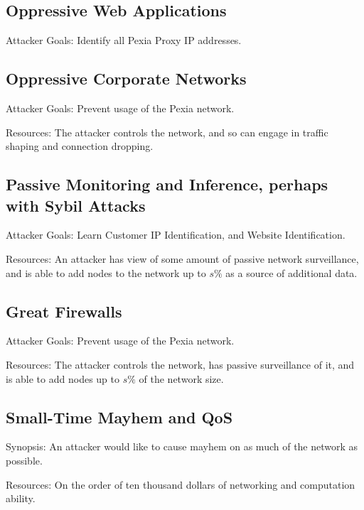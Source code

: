 \documentclass{article}
\newcommand{\mesh}{Pexia}
\newcommand{\Pexia}{\mesh}
\begin{document}
\subsection{Oppressive Web Applications}

Attacker Goals: Identify all \Pexia{} Proxy IP addresses.

\subsection{Oppressive Corporate Networks}

Attacker Goals: Prevent usage of the \Pexia{} network.

Resources: The attacker controls the network, and so can engage in traffic shaping and connection dropping.

\subsection{Passive Monitoring and Inference, perhaps with Sybil Attacks}

Attacker Goals: Learn Customer IP Identification, and Website Identification.

Resources: An attacker has view of some amount of passive network surveillance, and is able to add nodes to the network up to $s\%$ as a source of additional data.

\subsection{Great Firewalls}

Attacker Goals: Prevent usage of the \Pexia{} network.

Resources: The attacker controls the network, has passive surveillance of it, and is able to add nodes up to $s\%$ of the network size.

\subsection{Small-Time Mayhem and QoS}

Synopsis: An attacker would like to cause mayhem on as much of the network as possible.

Resources: On the order of ten thousand dollars of networking and computation ability.

\end{document}
